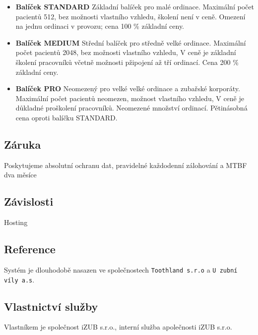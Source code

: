 \documentclass[12pt, a4paper, titlepage]{article}
\begin{document}
	\newpage

	\noindent\makebox[\linewidth]{\rule{16cm}{0.4pt}}

	\begin{itemize}

		

		\item \textbf{Balíček STANDARD} Základní balíček pro malé ordinace. Maximální počet pacientů 512, bez možnosti vlastního vzhledu, školení není v ceně. Omezení na jednu ordinaci v provozu; cena 100 \% základní ceny.

		\item \textbf{Balíček MEDIUM} Střední balíček pro středně velké ordinace. Maximální počet pacientů 2048, bez možnosti vlastního vzhledu, V ceně je základní školení pracovníků včetně možnosti pžipojení až tří ordinací. Cena 200 \% základní ceny.

		\item \textbf{Balíček PRO} Neomezený pro velké velké ordinace a zubařské korporáty. Maximální počet pacientů neomezen, možnost vlastního vzhledu, V ceně je důkladné proškolení pracovníků. Neomezené množství ordinací. Pětinásobná cena oproti balíčku STANDARD.
	\end{itemize}

	\subsection*{Záruka}

	Poskytujeme absolutní ochranu dat, pravidelné každodenní zálohování a MTBF dva měsíce

	\subsection*{Závislosti}

	Hosting

	\subsection*{Reference}
	Systém je dlouhodobě nasazen ve společnostech \texttt{Toothland s.r.o} a \texttt{U zubní víly a.s}.

	\subsection*{Vlastnictví služby}

	Vlastníkem je společnost iZUB s.r.o., interní služba apolečnosti iZUB s.r.o.
\end{document}
